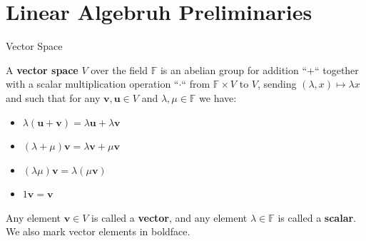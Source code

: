 \documentclass{beamer}
\begin{document}
    \section{Linear Algebruh Preliminaries}

    \begin{frame}{Vector Space}
        \begin{definition}
            A \textbf{vector space} $V$ over the field $\mathbb{F}$ is an abelian group for addition
            ``$+$`` together with a scalar multiplication operation ``$\cdot$`` from $\mathbb{F} \times V$
            to $V$, sending $(\lambda,x) \mapsto \lambda x$ and such that for any 
            $\mathbf{v},\mathbf{u} \in V$ and $\lambda,\mu \in \mathbb{F}$ we have:
            \begin{itemize}
                \item $\lambda(\mathbf{u}+\mathbf{v}) = \lambda \mathbf{u} + \lambda \mathbf{v}$
                \item $(\lambda + \mu)\mathbf{v} = \lambda \mathbf{v} + \mu \mathbf{v}$
                \item $(\lambda \mu)\mathbf{v} = \lambda(\mu \mathbf{v})$
                \item $1\mathbf{v} = \mathbf{v}$
            \end{itemize}

            Any element $\mathbf{v} \in V$ is called a \textbf{vector}, and any element
            $\lambda \in \mathbb{F}$ is called a \textbf{scalar}. We also mark vector elements in 
            boldface.
        \end{definition}
    \end{frame}
\end{document}

